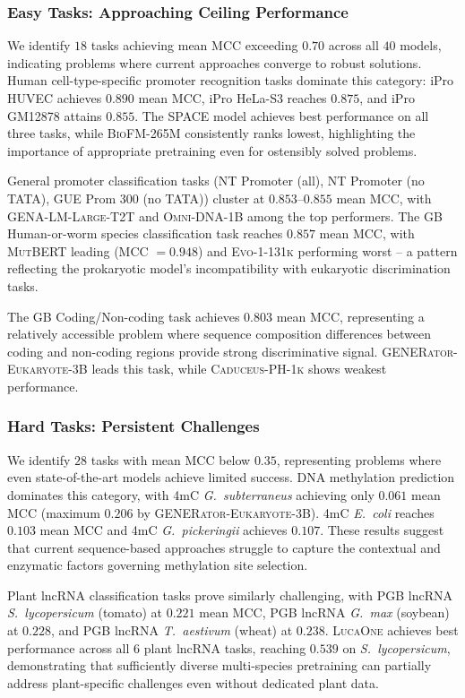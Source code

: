 \documentclass{article}
\theoremstyle{plain}
\theoremstyle{definition}
\theoremstyle{remark}
\begin{document}
\subsubsection{Easy Tasks: Approaching Ceiling Performance}

We identify $18$ tasks achieving mean MCC exceeding $0.70$
across all $40$ models, indicating problems where current
approaches converge to robust solutions. Human cell-type-specific
promoter recognition tasks dominate this category: iPro HUVEC
achieves $0.890$ mean MCC, iPro HeLa-S3 reaches $0.875$, and
iPro GM12878 attains $0.855$. The \textsc{SPACE} model achieves
best performance on all three tasks, while \textsc{BioFM-265M}
consistently ranks lowest, highlighting the importance of
appropriate pretraining even for ostensibly solved problems.

General promoter classification tasks (NT Promoter (all), NT
Promoter (no TATA), GUE Prom 300 (no TATA)) cluster at
$0.853$--$0.855$ mean MCC, with \textsc{GENA-LM-Large-T2T} and
\textsc{Omni-DNA-1B} among the top performers. The GB
Human-or-worm species classification task reaches $0.857$ mean
MCC, with \textsc{MutBERT} leading (MCC $= 0.948$) and
\textsc{Evo-1-131k} performing worst -- a pattern reflecting the
prokaryotic model's incompatibility with eukaryotic
discrimination tasks.

The GB Coding/Non-coding task achieves $0.803$ mean MCC,
representing a relatively accessible problem where sequence
composition differences between coding and non-coding regions
provide strong discriminative signal.
\textsc{GENERator-Eukaryote-3B} leads this task, while
\textsc{Caduceus-PH-1k} shows weakest performance.

\subsubsection{Hard Tasks: Persistent Challenges}

We identify $28$ tasks with mean MCC below $0.35$, representing
problems where even state-of-the-art models achieve limited
success. DNA methylation prediction dominates this category,
with 4mC \emph{G.\ subterraneus} achieving only $0.061$ mean MCC
(maximum $0.206$ by \textsc{GENERator-Eukaryote-3B}). 4mC
\emph{E.\ coli} reaches $0.103$ mean MCC and 4mC
\emph{G.\ pickeringii} achieves $0.107$. These results suggest
that current sequence-based approaches struggle to capture the
contextual and enzymatic factors governing methylation site
selection.

Plant lncRNA classification tasks prove similarly challenging,
with PGB lncRNA \emph{S.\ lycopersicum} (tomato) at $0.221$ mean
MCC, PGB lncRNA \emph{G.\ max} (soybean) at $0.228$, and PGB
lncRNA \emph{T.\ aestivum} (wheat) at $0.238$. \textsc{LucaOne}
achieves best performance across all $6$ plant lncRNA tasks,
reaching $0.539$ on \emph{S.\ lycopersicum}, demonstrating that
sufficiently diverse multi-species pretraining can partially
address plant-specific challenges even without dedicated plant
data.
\end{document}
